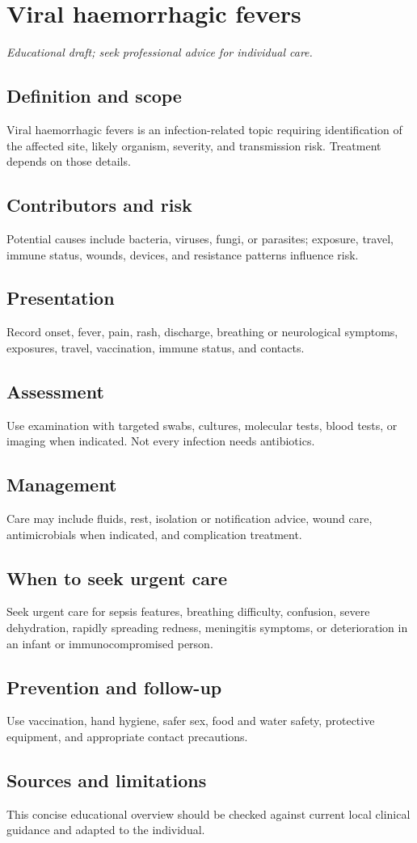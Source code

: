 \chapter{Viral haemorrhagic fevers}
\medskip
\noindent\textit{Educational draft; seek professional advice for individual care.}

\section*{Definition and scope}
Viral haemorrhagic fevers is an infection-related topic requiring identification of the affected site, likely organism, severity, and transmission risk. Treatment depends on those details.

\section*{Contributors and risk}
Potential causes include bacteria, viruses, fungi, or parasites; exposure, travel, immune status, wounds, devices, and resistance patterns influence risk.

\section*{Presentation}
Record onset, fever, pain, rash, discharge, breathing or neurological symptoms, exposures, travel, vaccination, immune status, and contacts.

\section*{Assessment}
Use examination with targeted swabs, cultures, molecular tests, blood tests, or imaging when indicated. Not every infection needs antibiotics.

\section*{Management}
Care may include fluids, rest, isolation or notification advice, wound care, antimicrobials when indicated, and complication treatment.

\section*{When to seek urgent care}
Seek urgent care for sepsis features, breathing difficulty, confusion, severe dehydration, rapidly spreading redness, meningitis symptoms, or deterioration in an infant or immunocompromised person.

\section*{Prevention and follow-up}
Use vaccination, hand hygiene, safer sex, food and water safety, protective equipment, and appropriate contact precautions.

\section*{Sources and limitations}
This concise educational overview should be checked against current local clinical guidance and adapted to the individual.
